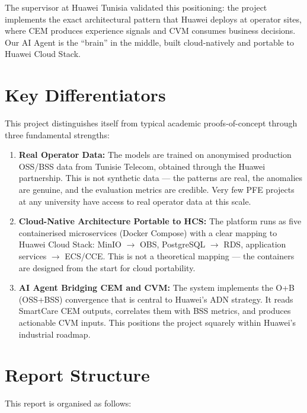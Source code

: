 The supervisor at Huawei Tunisia validated this positioning: the project implements the exact architectural pattern that Huawei deploys at operator sites, where CEM produces experience signals and CVM consumes business decisions. Our AI Agent is the ``brain'' in the middle, built cloud-natively and portable to Huawei Cloud Stack.

\section{Key Differentiators}

This project distinguishes itself from typical academic proofs-of-concept through three fundamental strengths:

\begin{enumerate}[label=\textbf{\arabic*.}]
  \item \textbf{Real Operator Data:} The models are trained on anonymised production OSS/BSS data from Tunisie Telecom, obtained through the Huawei partnership. This is not synthetic data --- the patterns are real, the anomalies are genuine, and the evaluation metrics are credible. Very few PFE projects at any university have access to real operator data at this scale.
  
  \item \textbf{Cloud-Native Architecture Portable to HCS:} The platform runs as five containerised microservices (Docker Compose) with a clear mapping to Huawei Cloud Stack: MinIO $\to$ OBS, PostgreSQL $\to$ RDS, application services $\to$ ECS/CCE. This is not a theoretical mapping --- the containers are designed from the start for cloud portability.
  
  \item \textbf{AI Agent Bridging CEM and CVM:} The system implements the O+B (OSS+BSS) convergence that is central to Huawei's ADN strategy. It reads SmartCare CEM outputs, correlates them with BSS metrics, and produces actionable CVM inputs. This positions the project squarely within Huawei's industrial roadmap.
\end{enumerate}

\section{Report Structure}

This report is organised as follows:

